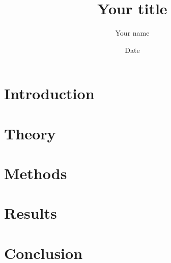 \documentclass[reprint, amsmath, amssymb, aps, superscriptaddress]{revtex4-2}
\begin{document}
	
	\title{Your title}
	\author{Your name}
	
	\date{Date}
	\begin{abstract}
		\lipsum[1]
	\end{abstract}
	
	\maketitle
	
	\section{Introduction}
	\lipsum[1]
	
	\section{Theory}
	\lipsum[1]
	
	\section{Methods}
	\lipsum[1]
	
	\section{Results}
	\lipsum[1]
	
	\section{Conclusion}
	\lipsum[1]
	
	\begin{acknowledgements}
		\lipsum[1]
	\end{acknowledgements}
	
	\appendix
	
	\nocite{*}
	
	
\end{document}
